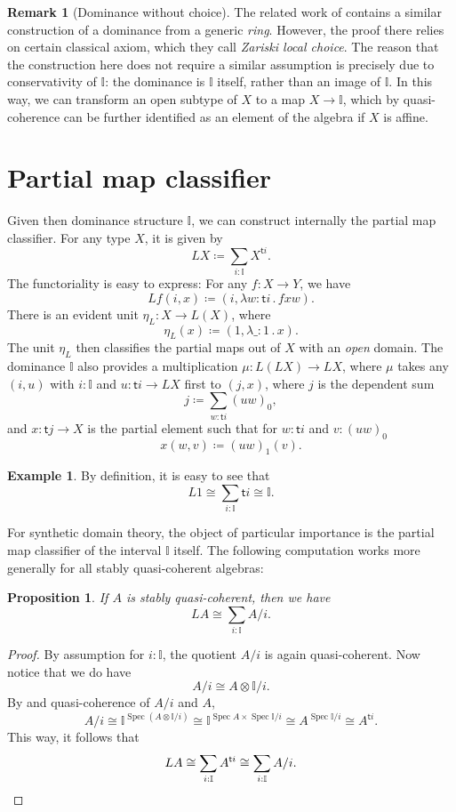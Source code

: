 \documentclass[a4paper,12pt]{amsart}
\newtheorem{proposition}[theorem]{Proposition}
\theoremstyle{definition}
\newtheorem{example}[theorem]{Example}
\newtheorem{remark}[theorem]{Remark}
\newcommand{\mbb}[1]{\mathbb{#1}}
\newcommand{\I}{\mbb I}
\newcommand{\ms}[1]{\mathsf{#1}}
\newcommand{\ld}[2]{\lambda #1\!\colon\!\!#2\mathpunct{.}}
\newcommand{\spec}{\operatorname{Spec}}
\begin{document}
\begin{remark}[Dominance without choice]\label{rem:dominancewithoutchoice}
  The related work of \citet{Cherubini_Coquand_Hutzler_2024} contains a similar construction of a dominance from a generic \emph{ring}. However, the proof there relies on certain classical axiom, which they call \emph{Zariski local choice}. The reason that the construction here does not require a similar assumption is precisely due to conservativity of $\I$: the dominance is $\I$ itself, rather than an image of $\I$. In this way, we can transform an open subtype of $X$ to a map $X \to \I$, which by quasi-coherence can be further identified as an element of the algebra if $X$ is affine. 
\end{remark}


\section{Partial map classifier}\label{sec:lifting}
Given then dominance structure $\I$, we can construct internally the partial map classifier. For any type $X$, it is given by
\[ L X \coloneq \sum_{i:\I}X^{\ms ti}. \]
The functoriality is easy to express: For any $f \colon X \to Y$, we have
\[ L f(i,x) \coloneq (i,\ld{w}{\ms ti}fxw). \]
There is an evident unit $\eta_L \colon X \to L(X)$, where
\[ \eta_L(x) \coloneq (1,\ld\_ 1 x). \]
The unit $\eta_L$ then classifies the partial maps out of $X$ with an \emph{open} domain. The dominance $\I$ also provides a multiplication $\mu \colon L(L X) \to L X$, where $\mu$ takes any $(i,u)$ with $i : \I$ and $u \colon \ms ti \to L X$ first to $(j,x)$, where $j$ is the dependent sum
\[ j \coloneq \sum_{w:\ms ti} (uw)_0, \]
and $x \colon \ms tj \to X$ is the partial element such that for $w : \ms ti$ and $v : (uw)_0$
\[ x(w,v) \coloneq (uw)_1(v). \]

\begin{example}
  By definition, it is easy to see that
  \[ L 1 \cong \sum_{i:\I}\ms ti \cong \I. \]
\end{example}

For synthetic domain theory, the object of particular importance is the partial map classifier of the interval $\I$ itself. The following computation works more generally for all stably quasi-coherent algebras:

\begin{proposition}\label{prop:liftingofalgebra}
  If $A$ is stably quasi-coherent, then we have
  \[ L A \cong \sum_{i:\I}A/i. \]
\end{proposition}
\begin{proof}
  By assumption for $i : \I$, the quotient $A/i$ is again quasi-coherent. Now notice that we do have
  \[ A/i \cong A \otimes \I/i. \]
  By  and quasi-coherence of $A/i$ and $A$,
  \[ A/i \cong \I^{\spec(A \otimes \I/i)} \cong \I^{\spec A \times \spec\I/i} \cong A^{\spec \I/i} \cong A^{\ms ti}. \]
  This way, it follows that 
  \[ L A \cong \sum_{i:\I}A^{\ms ti} \cong \sum_{i:\I}A/i. \qedhere \]
\end{proof}
\end{document}
